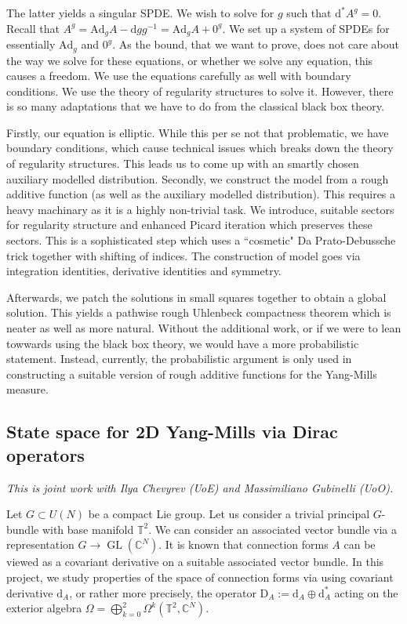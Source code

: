 \documentclass[12pt]{article}
\numberwithin{equation}{section}
\theoremstyle{definition}
\theoremstyle{remark}
\newcommand{\Ad}{\mathrm{Ad}}
\newcommand{\diff}{\mathrm{d}}
\newcommand{\1}{\mathbf 1}
\newcommand{\<}{\langle}
\renewcommand{\>}{\rangle}
\newcommand{\bT}{\mathbb T}
\begin{document}
The latter yields a singular SPDE. We wish to solve for $g$ such that $\diff^*A^g=0$. Recall that $A^g=\Ad_gA-\diff gg^{-1}=\Ad_gA+0^g$. We set up a system of SPDEs for essentially $\Ad_g$ and $0^g$. As the bound, that we want to prove, does not care about the way we solve for these equations, or whether we solve any equation, this causes a freedom. We use the equations carefully as well with boundary conditions. We use the theory of regularity structures to solve it. However, there is so many adaptations that we have to do from the classical black box theory. 


Firstly, our equation is elliptic. While this per se not that problematic, we have boundary conditions, which cause technical issues which breaks down the theory of regularity structures. This leads us to come up with an smartly chosen auxiliary modelled distribution.  Secondly, we construct the model from a rough additive function (as well as the auxiliary modelled distribution). This requires a heavy machinary as it is a highly non-trivial task. We introduce, suitable sectors for regularity structure and enhanced Picard iteration which preserves these sectors. This is a sophisticated step which uses a ``cosmetic" Da Prato-Debussche trick together with shifting of indices.   The construction of model goes via integration identities, derivative identities and symmetry.  

Afterwards, we patch the solutions in small squares together to obtain a global solution. This yields a pathwise rough Uhlenbeck compactness theorem which is neater as well as more natural. Without the additional work, or if we were to lean towwards using the black box theory, we would have a more probabilistic statement. Instead, currently, the probabilistic argument  is only used in constructing a suitable version of rough additive functions for the Yang-Mills measure. 
%




\subsection{State space for 2D Yang-Mills via Dirac operators}\label{sec:Dirac_2D}
%
\textit{This is joint work with Ilya Chevyrev (UoE) and Massimiliano Gubinelli (UoO).} 

\medskip 

\noindent Let $G\subset U(N)$ be a compact Lie group. Let us consider a trivial principal $G$-bundle with base manifold $\bT^2$. We can consider an associated vector bundle via a representation $G\to \operatorname{GL}(\mathbb C^N)$. It is known that connection forms $A$ can be viewed as a covariant derivative on a suitable associated vector bundle. In this project, we study properties of the space of connection forms via using covariant derivative $\diff_A$, or rather more precisely, the operator  $\mathrm{D}_A:=\diff_A\oplus\diff_A^*$ acting on the exterior algebra $\Omega=\bigoplus_{k=0}^ 2\Omega^k(\bT^2,\mathbb C^N)$. 
\end{document}
